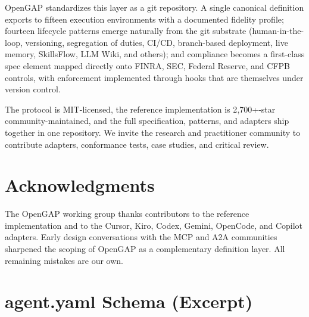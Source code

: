 \documentclass[11pt,a4paper]{article}
\begin{document}
OpenGAP standardizes this layer as a git repository. A single canonical definition
exports to fifteen execution environments with a documented fidelity profile; fourteen
lifecycle patterns emerge naturally from the git substrate (human-in-the-loop,
versioning, segregation of duties, CI/CD, branch-based deployment, live memory,
SkillsFlow, LLM Wiki, and others); and compliance becomes a first-class spec element
mapped directly onto FINRA, SEC, Federal Reserve, and CFPB controls, with enforcement
implemented through hooks that are themselves under version control.

The protocol is MIT-licensed, the reference implementation is 2{,}700+-star
community-maintained, and the full specification, patterns, and adapters ship together
in one repository. We invite the research and practitioner community to contribute
adapters, conformance tests, case studies, and critical review.

\section*{Acknowledgments}
\noindent
The OpenGAP working group thanks contributors to the reference implementation and to
the Cursor, Kiro, Codex, Gemini, OpenCode, and Copilot adapters. Early design
conversations with the MCP and A2A communities sharpened the scoping of OpenGAP as a
complementary definition layer. All remaining mistakes are our own.




\newpage
\appendix

\section{agent.yaml Schema (Excerpt)}\label{app:schema}
\end{document}
